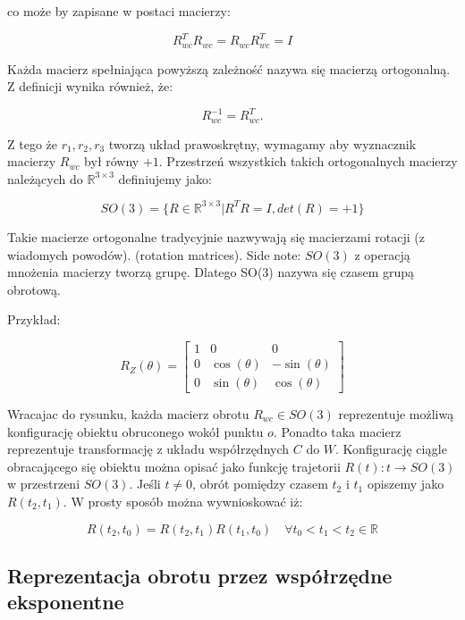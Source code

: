 \documentclass[a4paper,12pt]{article}
\newcommand{\R}{\mathbb{R}}
\newcommand{\RRR}{\mathbb{R}^{3 \times 3}}
\begin{document}
\noindent co może by zapisane w postaci macierzy:

\begin{equation}
R_{wc}^TR_{wc} = R_{wc}R_{wc}^T = I
\end{equation}

Każda macierz spełniająca powyższą zależność nazywa się macierzą ortogonalną. Z definicji wynika również, że:

\begin{equation}
R_{wc}^{-1} = R_{wc}^T. 
\end{equation}

Z tego że $r_1,r_2,r_3$ tworzą układ prawoskrętny, wymagamy aby wyznacznik macierzy $R_{wc}$ był równy $+1$. Przestrzeń wszystkich takich ortogonalnych macierzy należących do $\RRR$ definiujemy jako:

\begin{equation}
SO(3)=\{ R \in \RRR | R^TR = I, det(R)=+1 \}
\end{equation}

Takie macierze ortogonalne tradycyjnie nazwywają się macierzami rotacji (z wiadomych powodów). (rotation matrices). Side note: $SO(3)$ z operacją mnożenia macierzy tworzą grupę. Dlatego SO(3) nazywa się czasem grupą obrotową. 

\noindent Przykład:

\begin{equation}
R_Z(\theta) = 
\begin{bmatrix}
  1 & 0 & 0 \\
  0 & \cos(\theta) & -\sin(\theta) \\
  0 & \sin(\theta) & \cos(\theta)
\end{bmatrix}
\end{equation}

Wracajac do rysunku, każda macierz obrotu $R_{wc} \in SO(3)$ reprezentuje możliwą konfigurację obiektu obruconego wokół punktu $o$. Ponadto taka macierz reprezentuje transformację z układu współrzędnych $C$ do $W$. Konfigurację ciągle obracającego się obiektu można opisać jako funkcję trajetorii $R(t): t \rightarrow SO(3)$ w przestrzeni $SO(3)$. Jeśli $t \neq 0$, obrót pomiędzy czasem $t_2$ i $t_1$ opiszemy jako $R(t_2,t_1)$. W prosty sposób można wywnioskować iż:

\begin{equation}
R(t_2,t_0) = R(t_2,t_1)R(t_1,t_0) \quad \forall t_0 < t_1 < t_2 \in \R
\end{equation}

\subsection{Reprezentacja obrotu przez współrzędne eksponentne}
\end{document}
